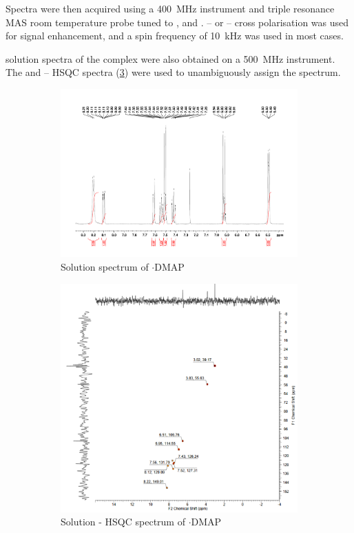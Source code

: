 \begin{refsection}
Spectra were then acquired using a 400~MHz instrument and triple resonance MAS room temperature probe tuned to ,  and  .
-- or -- cross polarisation was used for signal enhancement, and a spin frequency of 10~kHz was used in most cases.

 solution spectra of the complex were also obtained on a 500~MHz instrument.
The  and -- HSQC spectra (\cref{fig:ebs-4ome-dmap-sol}) were used to unambiguously assign the  spectrum.

\begin{figure}
    \centering
    \begin{subfigure}[t]{\linewidth}
    \centering
    \includegraphics[width=0.9\linewidth]{Figures/ebs-4ome-dmap-sol-1h.pdf}
    \caption{Solution  spectrum of $ \cdot $DMAP}\label{fig:ebs-4ome-dmap-sol-1h}
    \end{subfigure}

    \begin{subfigure}[t]{\linewidth}
    \centering
    \includegraphics[width=0.75\linewidth]{Figures/ebs-4ome-dmap-sol-hsqc.pdf}
    \caption{Solution - HSQC spectrum of $ \cdot $DMAP}\label{fig:ebs-4ome-dmap-sol-hsqc}
    \end{subfigure}
    \caption[Solution NMR spectra of \texorpdfstring{$ \cdot $}{.}DMAP.]{}\label{fig:ebs-4ome-dmap-sol}
\end{figure}


\end{refsection}
